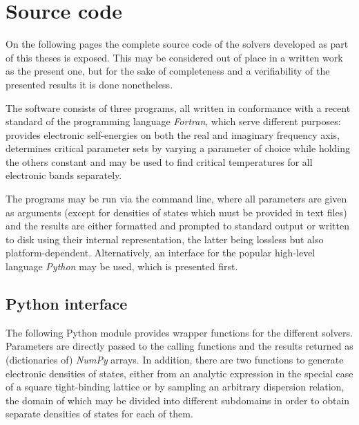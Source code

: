 
\def\path{../../ebmb}

\chapter{Source code}
\label{source code}

On the following pages the complete source code of the  solvers
developed as part of this theses is exposed. This may be considered out of place
in a written work as the present one, but for the sake of completeness and a
verifiability of the presented results it is done nonetheless.

The software consists of three programs, all written in conformance with a
recent standard of the programming language \emph{Fortran}, which serve
different purposes:  provides electronic self-energies on both the
real and imaginary frequency axis,  determines critical parameter
sets by varying a parameter of choice while holding the others constant and
 may be used to find critical temperatures for all electronic bands
separately.

The programs may be run via the command line, where all parameters are given as
arguments (except for densities of states which must be provided in text files)
and the results are either formatted and prompted to standard output or written
to disk using their internal representation, the latter being lossless but also
platform-dependent. Alternatively, an interface for the popular high-level
language \emph{Python} may be used, which is presented first.

\section{Python interface}
\label{Python interface}

The following Python module provides wrapper functions for the different
 solvers. Parameters are directly passed to the calling
functions and the results returned as (dictionaries of) \emph{NumPy} arrays. In
addition, there are two functions to generate electronic densities of states,
either from an analytic expression in the special case of a square tight-binding
lattice or by sampling an arbitrary dispersion relation, the domain of which may
be divided into different subdomains in order to obtain separate densities of
states for each of them.



